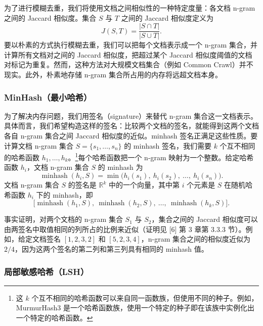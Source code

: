 为了进行模糊去重，我们将使用文档之间相似性的一种特定度量：各文档 n-gram 之间的 Jaccard 相似度。集合 $S$ 与 $T$ 之间的 Jaccard 相似度定义为
\begin{equation}
J(S, T) = \frac{\lvert S \cap T \rvert}{\lvert S \cup T \rvert}.
\end{equation}
要以朴素的方式执行模糊去重，我们可以把每个文档表示成一个 n-gram 集合，并计算所有文档对之间的 Jaccard 相似度，把超过某个 Jaccard 相似度阈值的文档对标记为重复。然而，这种方法对大规模文档集合（例如 Common Crawl）并不现实。此外，朴素地存储 n-gram 集合所占用的内存将远超文档本身。

\subsubsection*{MinHash（最小哈希）}

为了解决内存问题，我们用签名（signature）来替代 n-gram 集合这一文档表示。具体而言，我们希望构造这样的签名：比较两个文档的签名，就能得到这两个文档各自 n-gram 集合之间 Jaccard 相似度的近似。minhash 签名正满足这些性质。要计算文档 n-gram 集合 $S = \{s_1, \ldots, s_n\}$ 的 minhash 签名，我们需要 $k$ 个互不相同的哈希函数 $h_1, \ldots, h_k$。\footnote{这 $k$ 个互不相同的哈希函数可以来自同一函数族，但使用不同的种子。例如，MurmurHash3 是一个哈希函数族，使用一个特定的种子即在该族中实例化出一个特定的哈希函数。}每个哈希函数把一个 n-gram 映射为一个整数。给定哈希函数 $h_i$，文档 n-gram 集合 $S$ 的 minhash 为
\begin{equation}
\operatorname{minhash}(h_i, S) = \min\bigl(h_i(s_1),\ h_i(s_2),\ \ldots,\ h_i(s_n)\bigr).
\end{equation}
文档 n-gram 集合 $S$ 的签名是 $\mathbb{R}^k$ 中的一个向量，其中第 $i$ 个元素是 $S$ 在随机哈希函数 $h_i$ 下的 minhash，即
\begin{equation}
\bigl[\operatorname{minhash}(h_1, S),\ \operatorname{minhash}(h_2, S),\ \ldots,\ \operatorname{minhash}(h_k, S)\bigr].
\end{equation}

事实证明，对两个文档的 n-gram 集合 $S_1$ 与 $S_2$，集合之间的 Jaccard 相似度可以由两签名中取值相同的列所占的比例来近似（证明见 [6] 第 3 章第 3.3.3 节）。例如，给定文档签名 $[1, 2, 3, 2]$ 和 $[5, 2, 3, 4]$，n-gram 集合之间的相似度近似为 $2/4$，因为这两个签名的第二列和第三列具有相同的 minhash 值。

\subsubsection*{局部敏感哈希（LSH）}


